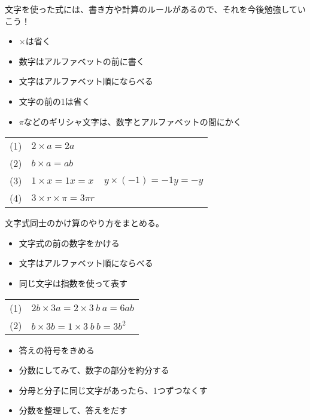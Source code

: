\documentclass[11pt]{article}
\begin{document}
文字を使った式には、書き方や計算のルールがあるので、それを今後勉強していこう！\\

\begin{tcolorbox}[mybox={文字式の書き方のルール}]
\begin{itemize}
\item $\times$は省く
\item 数字はアルファベットの前に書く
\item 文字はアルファベット順にならべる
\item 文字の前の1は省く
\item $\pi$などのギリシャ文字は、数字とアルファベットの間にかく
\end{itemize}
\end{tcolorbox}


\begin{tabular}{llr}
(1) & $2 \times a = 2a$ & \\
(2) & $b \times a = ab$ &\\
(3) & $1 \times x = 1x =x$ & \hspace{2cm} $y \times (-1) = -1y =-y$ \\
(4) & $3 \times r \times \pi = 3\pi r$ &\\
\end{tabular}


\begin{tcolorbox}[mybox={文字式の積}]
文字式同士のかけ算のやり方をまとめる。
\begin{itemize}
\item 文字式の前の数字をかける
\item 文字はアルファベット順にならべる
\item 同じ文字は指数を使って表す
\end{itemize}
\end{tcolorbox}


\begin{tabular}{ll}
(1) & $2b \times 3a = 2 \times 3 \ b \ a = 6 ab$\\
(2) & $b \times 3b = 1 \times 3\ b \  b = 3b^2$\\
\end{tabular}

\begin{tcolorbox}[mybox={文字式の商}]
\begin{itemize}
\item 答えの符号をきめる
\item 分数にしてみて、数字の部分を約分する
\item 分母と分子に同じ文字があったら、1つずつなくす
\item 分数を整理して、答えをだす
\end{itemize}
\end{tcolorbox}
\end{document}
